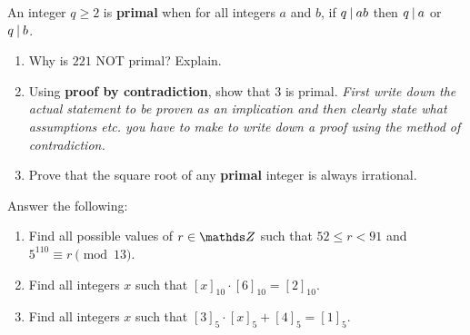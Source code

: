 \documentclass[11pt]{article}
\newcounter{Quesnumb}  %
\newcommand{\problemnum}{%
            \addtocounter{Quesnumb}{1}%
            \arabic{Quesnumb}}
\begin{document}
\begin{problem}{\problemnum}
\begin{tcolorbox}[colback=red!10!white, colframe=red!50!blue, title=Primal integers, center title]
\begin{define}
An integer $q \geq 2$ is \textbf{primal} when for all integers $a$ and $b$, if $q \mathbin\mid ab$ then $q \mathbin\mid a$ or $q \mathbin\mid b$.
\end{define}
\end{tcolorbox}
\begin{enumerate}[label=\alph*).]
    \item Why is $221$ NOT primal? Explain.
    \item Using \textbf{proof by contradiction}, show that $3$ is primal. \textit{First write down the actual statement to be proven as an implication and then clearly state what assumptions etc. you have to make to write down a proof using the method of contradiction.}
    \item Prove that the square root of any \textbf{primal} integer is always irrational.
\end{enumerate}
\end{problem}

\begin{problem}{\problemnum}
Answer the following:
\begin{enumerate}[label=\alph*).]
    \item Find all possible values of $r \in \bbZ$ such that $52 \leq r < 91$ and $5^{110} \equiv r \pmod{13}$.
    \item Find all integers $x$ such that $[x]_{10} \cdot [6]_{10} = [2]_{10}$.
    \item Find all integers $x$ such that $[3]_{5}\cdot [x]_{5} + [4]_{5}=[1]_{5}$.
\end{enumerate}
\end{problem}
\end{document}
